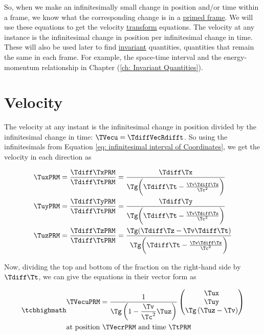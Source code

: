 So, when we make an infinitesimally small change in position and/or time within a frame, we know what the corresponding change is in a \hyperlink{def-Primed-Frame}{primed frame}.
We will use these equations to get the velocity \hyperlink{def-transform}{transform} equations.
The velocity at any instance is the infinitesimal change in position per infinitesimal change in time.
These will also be used later to find \hyperlink{def-lorentz-invariant}{invariant} quantities, quantities that remain the same in each frame.
For example, the space-time interval and the energy-momentum relationship in Chapter (\ref{ch: Invariant Quantities}).

\section{Velocity} \label{sect: Velocity}

The velocity at any instant is the infinitesimal change in position divided by the infinitesimal change in time: $\TVecu = \TdiffVecRdifft$.
So using the infinitesimals from Equation \eqref{eq: infinitesimal interval of Coordinates}, we get the velocity in each direction as

\begin{equation}
	\begin{aligned}
		 & \TuxPRM  = \frac{\Tdiff \TxPRM  }{\Tdiff \TtPRM  } = \frac{\Tdiff \Tx }{ \Tg  \bigg(\Tdiff \Tt -\frac{\Tv \Tdiff \Tz }{ \Tc ^2}\bigg)}                    \\
		 & \TuyPRM  = \frac{\Tdiff \TyPRM  }{\Tdiff \TtPRM  } = \frac{\Tdiff \Ty }{ \Tg  \bigg(\Tdiff \Tt -\frac{\Tv \Tdiff \Tz }{ \Tc ^2}\bigg)}                    \\
		 & \TuzPRM  = \frac{\Tdiff \TzPRM  }{\Tdiff \TtPRM  } = \frac{ \Tg  (\Tdiff \Tz  - {\Tv }\Tdiff \Tt )}{ \Tg  \bigg(\Tdiff \Tt -\frac{\Tv \Tdiff \Tz }{ \Tc ^2}\bigg)}
	\end{aligned}
\end{equation}

Now, dividing the top and bottom of the fraction on the right-hand side by ${\Tdiff \Tt }$, we can give the equations in their vector form as

\begin{equation}
	\mhl{
		\begin{aligned}
			 & \TVecuPRM  = \dfrac{1}{ {\Tg }\left(1-\dfrac{\Tv }{ \Tc ^2} {\Tuz }\right)}
			\begin{pmatrix}
				\Tux                                \\
				\Tuy                                \\
				{\Tg } \left( \Tuz  - \Tv  \right) \\
			\end{pmatrix}
			\\
			 & \text{at position ${\TVecrPRM  }$ and time $\TtPRM $}
		\end{aligned}
	}
	\label{eq: velocity transform}
\end{equation}

